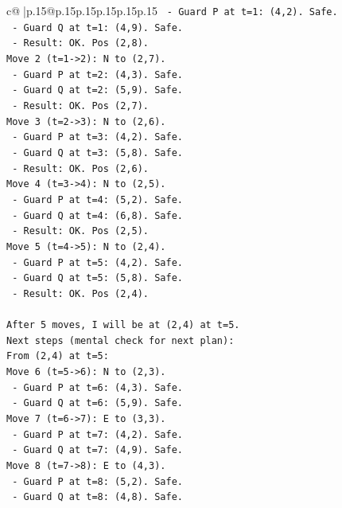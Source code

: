 \documentclass{article}
\begin{document}
{\begin{supertabular}{c@{$\;$}|p{.15\linewidth}@{}p{.15\linewidth}p{.15\linewidth}p{.15\linewidth}p{.15\linewidth}p{.15\linewidth}}
{{{\texttt{  {-} Guard P at t=1: (4,2). Safe.} \\
\texttt{  {-} Guard Q at t=1: (4,9). Safe.} \\
\texttt{  {-} Result: OK. Pos (2,8).} \\
\texttt{Move 2 (t=1{-}>2): N to (2,7).} \\
\texttt{  {-} Guard P at t=2: (4,3). Safe.} \\
\texttt{  {-} Guard Q at t=2: (5,9). Safe.} \\
\texttt{  {-} Result: OK. Pos (2,7).} \\
\texttt{Move 3 (t=2{-}>3): N to (2,6).} \\
\texttt{  {-} Guard P at t=3: (4,2). Safe.} \\
\texttt{  {-} Guard Q at t=3: (5,8). Safe.} \\
\texttt{  {-} Result: OK. Pos (2,6).} \\
\texttt{Move 4 (t=3{-}>4): N to (2,5).} \\
\texttt{  {-} Guard P at t=4: (5,2). Safe.} \\
\texttt{  {-} Guard Q at t=4: (6,8). Safe.} \\
\texttt{  {-} Result: OK. Pos (2,5).} \\
\texttt{Move 5 (t=4{-}>5): N to (2,4).} \\
\texttt{  {-} Guard P at t=5: (4,2). Safe.} \\
\texttt{  {-} Guard Q at t=5: (5,8). Safe.} \\
\texttt{  {-} Result: OK. Pos (2,4).} \\
\\ 
\texttt{After 5 moves, I will be at (2,4) at t=5.} \\
\texttt{Next steps (mental check for next plan):} \\
\texttt{From (2,4) at t=5:} \\
\texttt{Move 6 (t=5{-}>6): N to (2,3).} \\
\texttt{  {-} Guard P at t=6: (4,3). Safe.} \\
\texttt{  {-} Guard Q at t=6: (5,9). Safe.} \\
\texttt{Move 7 (t=6{-}>7): E to (3,3).} \\
\texttt{  {-} Guard P at t=7: (4,2). Safe.} \\
\texttt{  {-} Guard Q at t=7: (4,9). Safe.} \\
\texttt{Move 8 (t=7{-}>8): E to (4,3).} \\
\texttt{  {-} Guard P at t=8: (5,2). Safe.} \\
\texttt{  {-} Guard Q at t=8: (4,8). Safe.} \\
}}}
\end{supertabular}}
\end{document}
